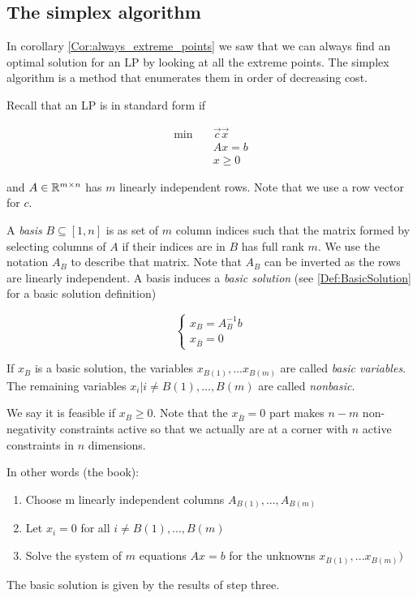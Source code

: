 \subsection{The simplex algorithm}

In corollary \ref{Cor:always_extreme_points} we saw that we can always find an optimal solution for an LP by looking at all the extreme points. The simplex algorithm is a method that enumerates them in order of decreasing cost. 

Recall that an LP is in standard form if

\begin{align*}
\min \quad & \vec c\vec x\\
&Ax = b\\
&x\geq 0
\end{align*}

and $A\in \mathbb{R}^{m\times n}$ has $m$ linearly independent rows. Note that we use a row vector for $c$.

A \emph{basis} $B\subseteq [1,n]$ is as set of $m$ column indices such that the matrix formed by selecting columns of $A$ if their indices are in $B$ has full rank $m$. We use the notation $A_B$ to describe that matrix. Note that $A_B$ can be inverted as the rows are linearly independent. A basis induces a \emph{basic solution} (see \ref{Def:BasicSolution} for a basic solution definition)

\[\begin{cases} x_B = A^{-1}_Bb\\ x_{\bar B} = 0\end{cases}\]

If $x_B$ is a basic solution, the variables $x_{B(1)},...x_{B(m)}$ are called \emph{basic variables}. The remaining variables $x_i|i \neq B(1),...,B(m)$ are called \emph{nonbasic}. 

We say it is feasible if $x_B\geq 0$. Note that the $x_{\bar B}=0$ part makes $n-m$ non-negativity constraints active so that we actually are at a corner with $n$ active constraints in $n$ dimensions.

In other words (the book):
\begin{enumerate} 
 \item Choose m linearly independent columns $A_{B(1)},...,A_{B(m)}$
 \item Let $x_i=0$ for all $i \neq B(1),...,B(m)$
 \item Solve the system of $m$ equations $Ax=b$ for the unknowns $x_{B(1)},...x_{B(m)})$
\end{enumerate}
The basic solution is given by the results of step three.

